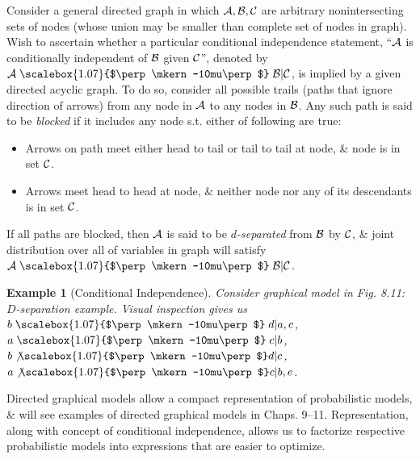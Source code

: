 \documentclass{article}
\newtheorem{example}{Example}
\newcommand{\bigCI}{\mathrel{\text{\scalebox{1.07}{$\perp\mkern-10mu\perp$}}}}
\begin{document}
\begin{itemize}
\begin{itemize}
\begin{itemize}
			Consider a general directed graph in which ${\cal A,B,C}$ are arbitrary nonintersecting sets of nodes (whose union may be smaller than complete set of nodes in graph). Wish to ascertain whether a particular conditional independence statement, ``${\cal A}$ is conditionally independent of ${\cal B}$ given ${\cal C}$'', denoted by ${\cal A}\bigCI{\cal B}|{\cal C}$, is implied by a given directed acyclic graph. To do so, consider all possible trails (paths that ignore direction of arrows) from any node in ${\cal A}$ to any nodes in ${\cal B}$. Any such path is said to be {\it blocked} if it includes any node s.t. either of following are true:
			\begin{itemize}
				\item Arrows on path meet either  head to tail or tail to tail at node, \& node is in set ${\cal C}$.
				\item Arrows meet head to head at node, \& neither node nor any of its descendants is in set ${\cal C}$.
			\end{itemize}
			If all paths are blocked, then ${\cal A}$ is said to be {\it$d$-separated} from ${\cal B}$ by ${\cal C}$, \& joint distribution over all of variables in graph will satisfy ${\cal A}\bigCI{\cal B}|{\cal C}$.
			\begin{example}[Conditional Independence]
				Consider  graphical model in {\sf Fig. 8.11: $D$-separation example.} Visual inspection gives us $b\bigCI d|a,c$, $a\bigCI c|b$, $b\not{\bigCI}d|c$, $a\not{\bigCI}c|b,e$.
			\end{example}
			Directed graphical models allow a compact representation of probabilistic models, \& will see examples of directed graphical models in Chaps. 9--11. Representation, along with concept of conditional independence, allows us to factorize respective probabilistic models into expressions that are easier to optimize.
			

\end{itemize}
\end{itemize}
\end{itemize}
\end{document}
